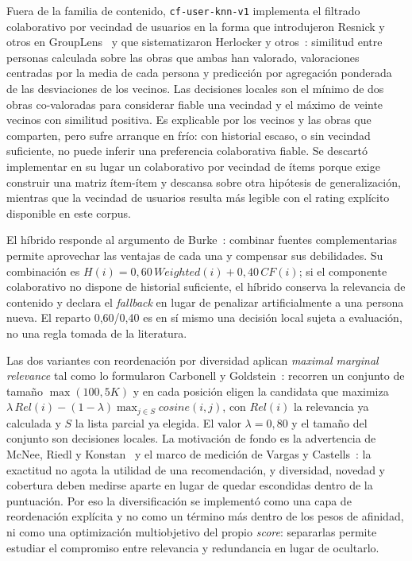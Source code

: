 Fuera de la familia de contenido, \texttt{cf-user-knn-v1} implementa el filtrado colaborativo
por vecindad de usuarios en la forma que introdujeron Resnick y otros en
GroupLens~\cite{resnick1994grouplens} y que sistematizaron Herlocker y
otros~\cite{herlocker2004evaluating}: similitud entre personas calculada sobre las obras que
ambas han valorado, valoraciones centradas por la media de cada persona y predicción por
agregación ponderada de las desviaciones de los vecinos. Las decisiones locales son el mínimo
de dos obras co-valoradas para considerar fiable una vecindad y el máximo de veinte vecinos con
similitud positiva. Es explicable por los vecinos y las obras que comparten, pero sufre
arranque en frío: con historial escaso, o sin vecindad suficiente, no puede inferir una
preferencia colaborativa fiable. Se descartó implementar en su lugar un colaborativo por
vecindad de ítems porque exige construir una matriz ítem-ítem y descansa sobre otra hipótesis
de generalización, mientras que la vecindad de usuarios resulta más legible con el rating
explícito disponible en este corpus.

El híbrido responde al argumento de Burke~\cite{burke2002hybrid}: combinar fuentes
complementarias permite aprovechar las ventajas de cada una y compensar sus debilidades. Su
combinación es \(H(i) = 0{,}60\,\mathit{Weighted}(i) + 0{,}40\,\mathit{CF}(i)\); si el
componente colaborativo no dispone de historial suficiente, el híbrido conserva la relevancia
de contenido y declara el \emph{fallback} en lugar de penalizar artificialmente a una persona
nueva. El reparto 0,60/0,40 es en sí mismo una decisión local sujeta a evaluación, no una regla
tomada de la literatura.

Las dos variantes con reordenación por diversidad aplican \emph{maximal marginal relevance}
tal como lo formularon Carbonell y Goldstein~\cite{carbonell1998mmr}: recorren un conjunto de
tamaño \(\max(100, 5K)\) y en cada posición eligen la candidata que maximiza
\(\lambda\,Rel(i) - (1-\lambda)\max_{j \in S} cosine(i,j)\), con \(Rel(i)\) la relevancia ya
calculada y \(S\) la lista parcial ya elegida. El valor \(\lambda = 0{,}80\) y el tamaño del
conjunto son decisiones locales. La motivación de fondo es la advertencia de McNee, Riedl y
Konstan~\cite{mcnee2006accurate} y el marco de medición de Vargas y
Castells~\cite{vargas2011rank}: la exactitud no agota la utilidad de una recomendación, y
diversidad, novedad y cobertura deben medirse aparte en lugar de quedar escondidas dentro de la
puntuación. Por eso la diversificación se implementó como una capa de reordenación explícita y
no como un término más dentro de los pesos de afinidad, ni como una optimización multiobjetivo
del propio \emph{score}: separarlas permite estudiar el compromiso entre relevancia y
redundancia en lugar de ocultarlo.

